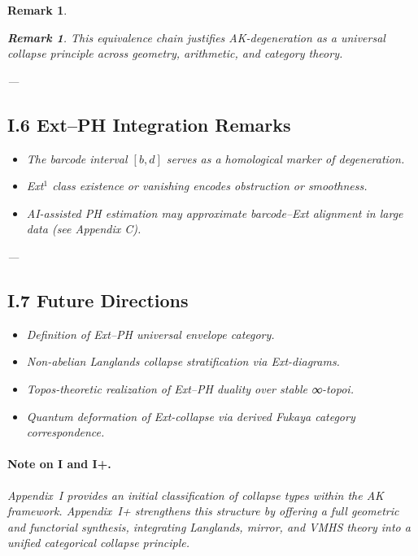 \documentclass[11pt]{article}
\newtheorem{remark}[theorem]{Remark}
\begin{document}
\begin{remark}
\begin{remark}
This equivalence chain justifies AK-degeneration as a universal collapse principle across geometry, arithmetic, and category theory.
\end{remark}

---

\subsection*{I.6 Ext–PH Integration Remarks}

\begin{itemize}
  \item The barcode interval $[b,d]$ serves as a homological marker of degeneration.
  \item Ext${}^1$ class existence or vanishing encodes obstruction or smoothness.
  \item AI-assisted PH estimation may approximate barcode–Ext alignment in large data (see Appendix C).
\end{itemize}

---

\subsection*{I.7 Future Directions}

\begin{itemize}
  \item Definition of Ext–PH universal envelope category.
  \item Non-abelian Langlands collapse stratification via Ext-diagrams.
  \item Topos-theoretic realization of Ext–PH duality over stable ∞-topoi.
  \item Quantum deformation of Ext-collapse via derived Fukaya category correspondence.
\end{itemize}

\paragraph{Note on I and I+.}
Appendix~I provides an initial classification of collapse types within the AK framework.  
Appendix~I+ strengthens this structure by offering a full geometric and functorial synthesis, integrating Langlands, mirror, and VMHS theory into a unified categorical collapse principle.




\end{remark}
\end{document}
